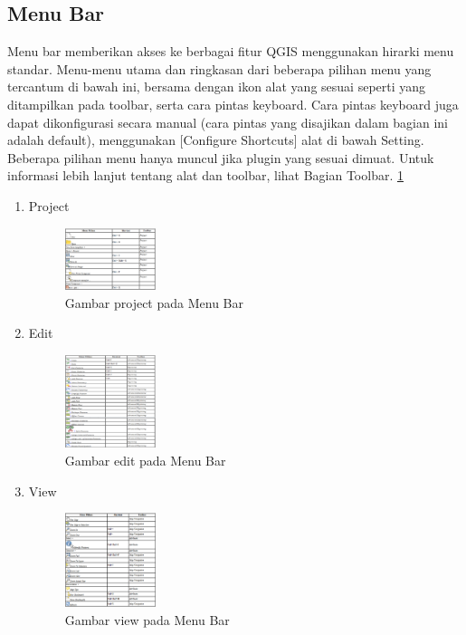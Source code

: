 \subsection{Menu Bar}
Menu bar memberikan akses ke berbagai fitur QGIS menggunakan hirarki menu standar. Menu-menu utama dan ringkasan dari beberapa pilihan menu yang tercantum di bawah ini, bersama dengan ikon alat yang sesuai seperti yang ditampilkan pada toolbar, serta cara pintas keyboard. Cara pintas keyboard juga dapat dikonfigurasi secara manual (cara pintas yang disajikan dalam bagian ini adalah default), menggunakan [Configure Shortcuts] alat di bawah Setting. Beberapa pilihan menu hanya muncul jika plugin yang sesuai dimuat. Untuk informasi lebih lanjut tentang alat dan toolbar, lihat Bagian Toolbar. \ref{menubar}
\begin{enumerate}
\item
Project
\begin{figure}[ht]
    \centerline{\includegraphics[width=0.25\textwidth]{figures/menubar.png}}
    \caption{Gambar project pada Menu Bar}
    \label{menubar}
    \end{figure}
\item
Edit
\begin{figure}[ht]
    \centerline{\includegraphics[width=0.25\textwidth]{figures/menubar1.png}}
    \caption{Gambar edit pada Menu Bar}
    \label{menubar1}
    \end{figure}
\item
View
\begin{figure}[ht]
    \centerline{\includegraphics[width=0.25\textwidth]{figures/menubar2.png}}
    \caption{Gambar view pada Menu Bar}
    \label{menubar2}
    \end{figure}
\end{enumerate}

